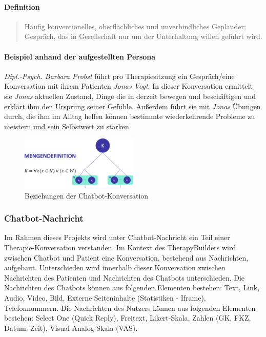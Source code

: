 \paragraph{Definition}
\begin{quote}
Häufig konventionelles, oberflächliches und unverbindliches Geplauder; Gespräch, das in Gesellschaft nur um der Unterhaltung willen geführt wird. \cite{DudenKon2:online}
\end{quote}

\paragraph{Beispiel anhand der aufgestellten Persona}
\emph{Dipl.-Psych. Barbara Probst} führt pro Therapiesitzung ein Gespräch/eine Konversation mit ihrem Patienten \emph{Jonas Vogt}. In dieser Konversation ermittelt sie \emph{Jonas} aktuellen Zustand, Dinge die in derzeit bewegen und beschäftigen und erklärt ihm den Ursprung seiner Gefühle. Außerdem führt sie mit \emph{Jonas} Übungen durch, die ihm im Alltag helfen können bestimmte wiederkehrende Probleme zu meistern und sein Selbstwert zu stärken.

\begin{figure}[h]
\centering
\includegraphics[width=0.5\textwidth]{pictures/konvesationdef}
\caption{Beziehungen der Chatbot-Konversation}
\label{therapiedef}
\end{figure}


\subsubsection{Chatbot-Nachricht}
Im Rahmen dieses Projekts wird unter Chatbot-Nachricht ein Teil einer Therapie-Konversation verstanden. Im Kontext des TherapyBuilders wird zwischen Chatbot und Patient eine Konversation, bestehend aus Nachrichten, aufgebaut. Unterschieden wird innerhalb dieser Konversation zwischen Nachrichten des Patienten und Nachrichten des Chatbots unterschieden. Die Nachrichten des Chatbots können aus folgenden Elementen bestehen: Text, Link, Audio, Video, Bild, Externe Seiteninhalte (Statistiken - Iframe), Telefonnummern. Die Nachrichten des Nutzers können aus folgenden Elementen bestehen: Select One (Quick Reply), Freitext, Likert-Skala, Zahlen (GK, FKZ, Datum, Zeit), Visual-Analog-Skala (VAS).

